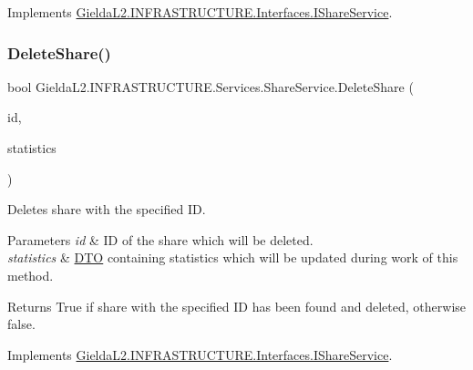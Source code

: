 Implements \mbox{\hyperlink{interface_gielda_l2_1_1_i_n_f_r_a_s_t_r_u_c_t_u_r_e_1_1_interfaces_1_1_i_share_service_af16b2def564564d797761394b9d0b9af}{Gielda\+L2.\+I\+N\+F\+R\+A\+S\+T\+R\+U\+C\+T\+U\+R\+E.\+Interfaces.\+I\+Share\+Service}}.

\mbox{\label{class_gielda_l2_1_1_i_n_f_r_a_s_t_r_u_c_t_u_r_e_1_1_services_1_1_share_service_a2846452ec756a28a540b81c6a3f95685}} 
\subsubsection{\texorpdfstring{DeleteShare()}{DeleteShare()}}
{\footnotesize\ttfamily bool Gielda\+L2.\+I\+N\+F\+R\+A\+S\+T\+R\+U\+C\+T\+U\+R\+E.\+Services.\+Share\+Service.\+Delete\+Share (\begin{DoxyParamCaption}\item[{int}]{id,  }\item[{\mbox{\hyperlink{class_gielda_l2_1_1_i_n_f_r_a_s_t_r_u_c_t_u_r_e_1_1_d_t_o_1_1_statistics_d_t_o}{Statistics\+D\+TO}}}]{statistics }\end{DoxyParamCaption})}



Deletes share with the specified ID. 


\begin{DoxyParams}{Parameters}
{\em id} & ID of the share which will be deleted.\\
\hline
{\em statistics} & \mbox{\hyperlink{namespace_gielda_l2_1_1_i_n_f_r_a_s_t_r_u_c_t_u_r_e_1_1_d_t_o}{D\+TO}} containing statistics which will be updated during work of this method.\\
\hline
\end{DoxyParams}
\begin{DoxyReturn}{Returns}
True if share with the specified ID has been found and deleted, otherwise false.
\end{DoxyReturn}


Implements \mbox{\hyperlink{interface_gielda_l2_1_1_i_n_f_r_a_s_t_r_u_c_t_u_r_e_1_1_interfaces_1_1_i_share_service_a730d0635042a9ecd69c6290f55f019db}{Gielda\+L2.\+I\+N\+F\+R\+A\+S\+T\+R\+U\+C\+T\+U\+R\+E.\+Interfaces.\+I\+Share\+Service}}.

